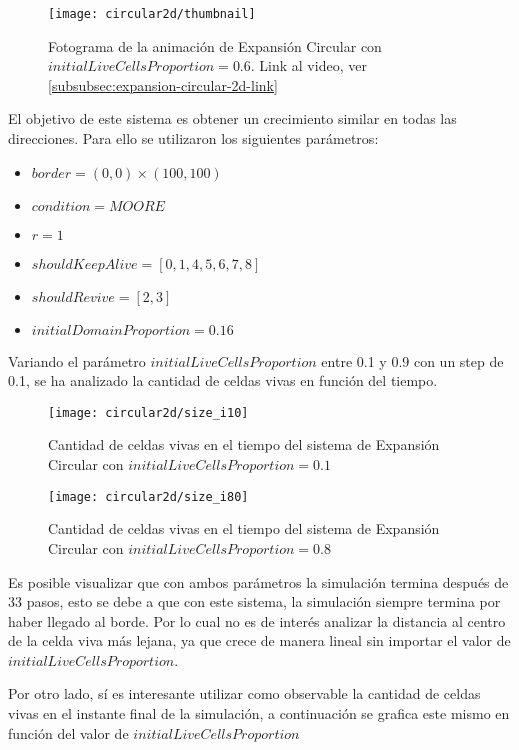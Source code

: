 \begin{figure}[H]
    \centering
    \texttt{[image: circular2d/thumbnail]}
    \caption{Fotograma de la animación de Expansión Circular con $initialLiveCellsProportion = 0.6$. Link al video, ver \ref{subsubsec:expansion-circular-2d-link}}
    \label{fig:thumbnailcircular2d_i60}
\end{figure}

El objetivo de este sistema es obtener un crecimiento similar en todas las direcciones.
Para ello se utilizaron los siguientes parámetros:

\begin{itemize}
    \item $border = (0, 0) \times (100, 100)$
    \item $condition = MOORE$
    \item $r = 1$
    \item $shouldKeepAlive = [0, 1, 4, 5, 6, 7, 8]$
    \item $shouldRevive = [2, 3]$
    \item $initialDomainProportion = 0.16$
\end{itemize}

Variando el parámetro $initialLiveCellsProportion$ entre 0.1 y 0.9 con un step de 0.1, se ha analizado la cantidad de celdas vivas en función
del tiempo.

\begin{figure}[H]
    \centering
    \texttt{[image: circular2d/size\_i10]}
    \caption{Cantidad de celdas vivas en el tiempo del sistema de Expansión Circular con $initialLiveCellsProportion = 0.1$}
    \label{fig:circular2d_i10}
\end{figure}
\begin{figure}[H]
    \centering
    \texttt{[image: circular2d/size\_i80]}
    \caption{Cantidad de celdas vivas en el tiempo del sistema de Expansión Circular con $initialLiveCellsProportion = 0.8$}
    \label{fig:circular2d_i80}
\end{figure}


Es posible visualizar que con ambos parámetros la simulación termina después de 33 pasos, esto se debe a que con este sistema, la simulación
siempre termina por haber llegado al borde. Por lo cual no es de interés analizar la distancia al centro de la celda viva más lejana, ya que
crece de manera lineal sin importar el valor de $initialLiveCellsProportion$.

Por otro lado, sí es interesante utilizar como observable la cantidad de celdas vivas en el instante final de la simulación, a continuación se
grafica este mismo en función del valor de $initialLiveCellsProportion$



